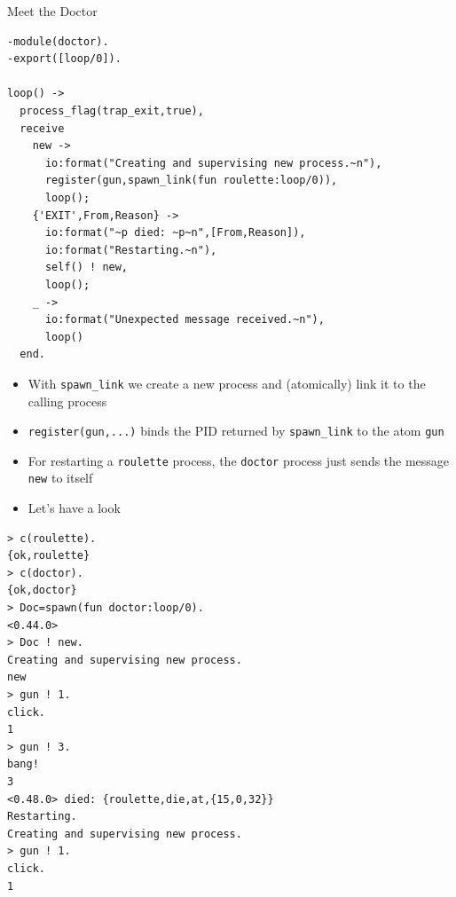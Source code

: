 \documentclass[12pt,xcolor=svgnames]{beamer}
\begin{document}
\begin{frame}{Meet the Doctor}

\begin{Verbatim}
-module(doctor).
-export([loop/0]).

loop() ->
  process_flag(trap_exit,true),
  receive
    new ->
      io:format("Creating and supervising new process.~n"),
      register(gun,spawn_link(fun roulette:loop/0)),
      loop();
    {'EXIT',From,Reason} ->
      io:format("~p died: ~p~n",[From,Reason]),
      io:format("Restarting.~n"),
      self() ! new,
      loop();
    _ ->
      io:format("Unexpected message received.~n"),
      loop()	
  end.		
\end{Verbatim}

\framebreak

\begin{itemize}
\item With \texttt{spawn\_link} we create a new process and (atomically) link it to the calling process
\item \texttt{register(gun,...)} binds the PID returned by \verb!spawn_link! to the atom \texttt{gun}
\item For restarting a \texttt{roulette} process, the \texttt{doctor} process 
just sends the message \texttt{new} to itself
\item Let's have a look
\end{itemize}

\framebreak

\begin{Verbatim}
> c(roulette).
{ok,roulette}
> c(doctor).
{ok,doctor}
> Doc=spawn(fun doctor:loop/0).
<0.44.0>
> Doc ! new.
Creating and supervising new process.
new
> gun ! 1.
click.
1
> gun ! 3.
bang!
3
<0.48.0> died: {roulette,die,at,{15,0,32}}
Restarting.
Creating and supervising new process.
> gun ! 1.
click.
1
\end{Verbatim}
\end{frame}
\end{document}
